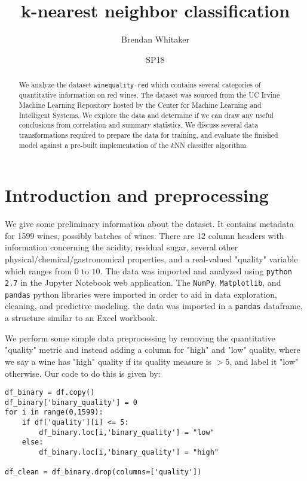 \documentclass[11pt,oneside,reqno]{amsart}
\theoremstyle{plain}
\theoremstyle{definition}
\theoremstyle{remark}
\newcommand{\inlinecode}{\texttt}
\begin{document}
\begin{abstract}
We analyze the dataset \inlinecode{winequality-red} which contains several categories of quantitative information on red wines. The dataset was sourced from the UC Irvine Machine Learning Repository hosted by the Center for Machine Learning and Intelligent Systems. We explore the data and determine if we can draw any useful conclusions from correlation and summary statistics. We discuss several data transformations required to prepare the data for training, and evaluate the finished model against a pre-built implementation of the $k$NN classifier algorithm. 
\end{abstract}
\title{k-nearest neighbor classification}
\date{SP18}
\author[Brendan Whitaker]{Brendan Whitaker}
\maketitle
\tableofcontents

\section{Introduction and preprocessing}

We give some preliminary information about the dataset. It contains metadata for 1599 wines, possibly batches of wines. There are 12 column headers with information concerning the acidity, residual sugar, several other physical/chemical/gastronomical properties, and a real-valued "quality" variable which ranges from $0$ to $10$. The data was imported and analyzed using \inlinecode{python 2.7} in the Jupyter Notebook web application. The \inlinecode{NumPy}, \inlinecode{Matplotlib}, and \inlinecode{pandas} python libraries were imported in order to aid in data exploration, cleaning, and predictive modeling. the data was imported in a \inlinecode{pandas} dataframe, a structure similar to an Excel workbook.  









We perform some simple data preprocessing by removing the quantitative "quality" metric and instead adding a column for "high" and "low" quality, where we say a wine has "high" quality if its quality measure is $> 5$, and label it "low" otherwise. Our code to do this is given by: 
\begin{framed}
\begin{verbatim}
df_binary = df.copy()
df_binary['binary_quality'] = 0
for i in range(0,1599):
    if df['quality'][i] <= 5:
        df_binary.loc[i,'binary_quality'] = "low"
    else:
        df_binary.loc[i,'binary_quality'] = "high"
        
df_clean = df_binary.drop(columns=['quality'])
\end{verbatim}
\end{framed}
\end{document}
